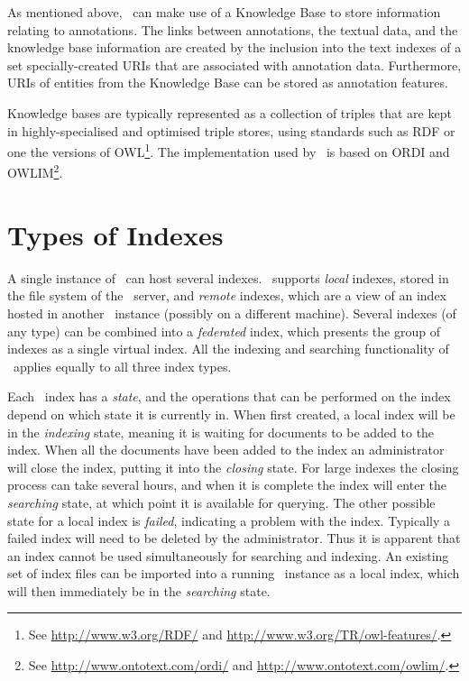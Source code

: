 As mentioned above, \Mimir\ can make use of a Knowledge Base to store
information relating to annotations. The links between annotations, the textual
data, and the knowledge base information are created by the inclusion into the
text indexes of a set specially-created URIs that are associated with
annotation data. Furthermore, URIs of entities from the Knowledge Base can be
stored as annotation features.

Knowledge bases are typically represented as a collection of triples that are
kept in highly-specialised and optimised triple stores, using standards such as
RDF or one the versions of OWL\footnote{See
\url{http://www.w3.org/RDF/} and \url{http://www.w3.org/TR/owl-features/}.}. The
implementation used by \Mimir\ is based on ORDI and
OWLIM\footnote{See
\url{http://www.ontotext.com/ordi/} and \url{http://www.ontotext.com/owlim/}.}.

\section{Types of Indexes}\label{sec:mimir:index-types}

A single instance of \Mimir\ can host several indexes.  \Mimir\ supports
{\em local} indexes, stored in the file system of the \Mimir\ server, and
{\em remote} indexes, which are a view of an index hosted in another \Mimir\
instance (possibly on a different machine).  Several indexes (of any type) can
be combined into a {\em federated} index, which presents the group of indexes as
a single virtual index.  All the indexing and searching functionality of
\Mimir\ applies equally to all three index types.

Each \Mimir\ index has a {\em state}, and the operations that can be performed
on the index depend on which state it is currently in.  When first created, a
local index will be in the {\em indexing} state, meaning it is waiting for
documents to be added to the index.  When all the documents have been added to
the index an administrator will close the index, putting it into the {\em
closing} state.  For large indexes the closing process can take several hours,
and when it is complete the index will enter the {\em searching} state, at
which point it is available for querying.  The other possible state for a local
index is {\em failed}, indicating a problem with the index.  Typically a failed
index will need to be deleted by the administrator.  Thus it is apparent that
an index cannot be used simultaneously for searching and indexing.  An existing
set of index files can be imported into a running \Mimir\ instance as a local
index, which will then immediately be in the {\em searching} state.

